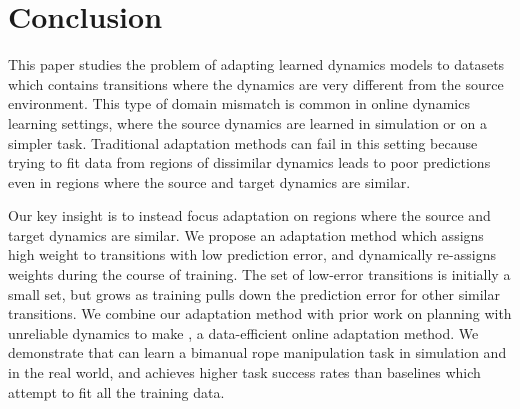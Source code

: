 \section{Conclusion} \label{ICRA:sec:conclusion}

This paper studies the problem of adapting learned dynamics models to datasets which contains transitions where the dynamics are very different from the source environment. This type of domain mismatch is common in online dynamics learning settings, where the source dynamics are learned in simulation or on a simpler task. Traditional adaptation methods can fail in this setting because trying to fit data from regions of dissimilar dynamics leads to poor predictions even in regions where the source and target dynamics are similar.

Our key insight is to instead focus adaptation on regions where the source and target dynamics are similar. We propose an adaptation method which assigns high weight to transitions with low prediction error, and dynamically re-assigns weights during the course of training. The set of low-error transitions is initially a small set, but grows as training pulls down the prediction error for other similar transitions. We combine our adaptation method with prior work on planning with unreliable dynamics to make \FOCUS{}, a data-efficient online adaptation method. We demonstrate that \FOCUS{} can learn a bimanual rope manipulation task in simulation and in the real world, and achieves higher task success rates than baselines which attempt to fit all the training data.